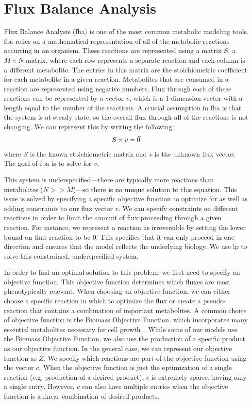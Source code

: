\section{Flux Balance Analysis}
Flux Balance Analysis (\gls{fba}) is one of the most common metabolic modeling tools.
\gls{fba} relies on a mathematical representation of all of the metabolic reactions occurring in an organism.
These reactions are represented using a matrix $S$, a $M \times N$ matrix, where each row represents a separate reaction and each column is a different metabolite.
The entries in this matrix are the stoichiometric coefficient for each metabolite in a given reaction.
Metabolites that are consumed in a reaction are represented using negative numbers.
Flux through each of these reactions can be represented by a vector $v$, which is a 1-dimension vector with a length equal to the number of the reactions.
A crucial assumption in \gls{fba} is that the system is at steady state, so the overall flux through all of the reactions is not changing.
We can represent this by writing the following:
\begin{equation}
S \times v = \vec{0} \\
\end{equation}
where $S$ is the known stoichiometric matrix and $v$ is the unknown flux vector.
The goal of \gls{fba} is to solve for $v$.

This system is underspecified---there are typically more reactions than metabolites ($N >> M$)---so there is no unique solution to this equation.
This issue is solved by specifying a specific objective function to optimize for as well as adding constraints to our flux vector $v$.
We can specify constraints on different reactions in order to limit the amount of flux proceeding through a given reaction.
For instance, we represent a reaction as irreversible by setting the lower bound on that reaction to be 0.
This specifies that it can only proceed in one direction and ensures that the model reflects the underlying biology.
We use \gls{lp} to solve this constrained, underspecified system. 

In order to find an optimal solution to this problem, we first need to specify an objective function.
This objective function determines which fluxes are most phenotypically relevant.
When choosing an objective function, we can either choose a specific reaction in which to optimize the flux or create a pseudo-reaction that contains a combination of important metabolites.
A common choice of objective function is the Biomass Objective Function, which incorporates many essential metabolites necessary for cell growth~\cite{feist2010biomass}.
While some of our models use the Biomass Objective Function, we also use the production of a specific product as our objective function.
In the general case, we can represent our objective function as $Z$.
We specify which reactions are part of the objective function using the vector $c$.
When the objective function is just the optimization of a single reaction (e.g. production of a desired product), $c$ is extremely sparse, having only a single entry.
However, $c$ can also have multiple entries when the objective function is a linear combination of desired products.

